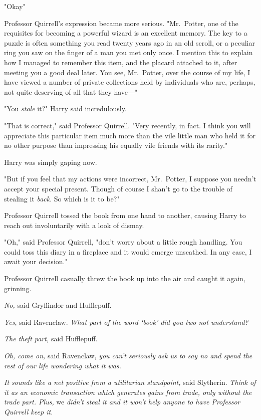 "Okay{\el}"

Professor Quirrell's expression became more serious. "Mr.~Potter, one of the
requisites for becoming a powerful wizard is an excellent memory. The key to a
puzzle is often something you read twenty years ago in an old scroll, or a
peculiar ring you saw on the finger of a man you met only once. I mention this
to explain how I managed to remember this item, and the placard attached to it,
after meeting you a good deal later. You see, Mr.~Potter, over the course of my
life, I have viewed a number of private collections held by individuals who
are, perhaps, not quite deserving of all that they have\mbox{---}"

"You \emph{stole} it?" Harry said incredulously.

"That is correct," said Professor Quirrell. "Very recently, in fact. I think
you will appreciate this particular item much more than the vile little man who
held it for no other purpose than impressing his equally vile friends with its
rarity."

Harry was simply gaping now.

"But if you feel that my actions were incorrect, Mr.~Potter, I suppose you
needn't accept your special present. Though of course I shan't go to the
trouble of stealing it \emph{back}. So which is it to be?"

Professor Quirrell tossed the book from one hand to another, causing Harry to
reach out involuntarily with a look of dismay.

"Oh," said Professor Quirrell, "don't worry about a little rough handling. You
could toss this diary in a fireplace and it would emerge unscathed. In any
case, I await your decision."

Professor Quirrell casually threw the book up into the air and caught it again,
grinning.

\emph{No,} said Gryffindor and Hufflepuff.

\emph{Yes}, said Ravenclaw. \emph{What part of the word `book' did you two not
understand?}

\emph{The theft part,} said Hufflepuff.

\emph{Oh, come on,} said Ravenclaw, \emph{you can't seriously ask us to say no
and spend the rest of our life wondering what it was.}

\emph{It sounds like a net positive from a utilitarian standpoint,} said
Slytherin. \emph{Think of it as an economic transaction which generates gains
from trade, only without the trade part. Plus,} we \emph{didn't steal it and it
won't help anyone to have Professor Quirrell keep it.}

